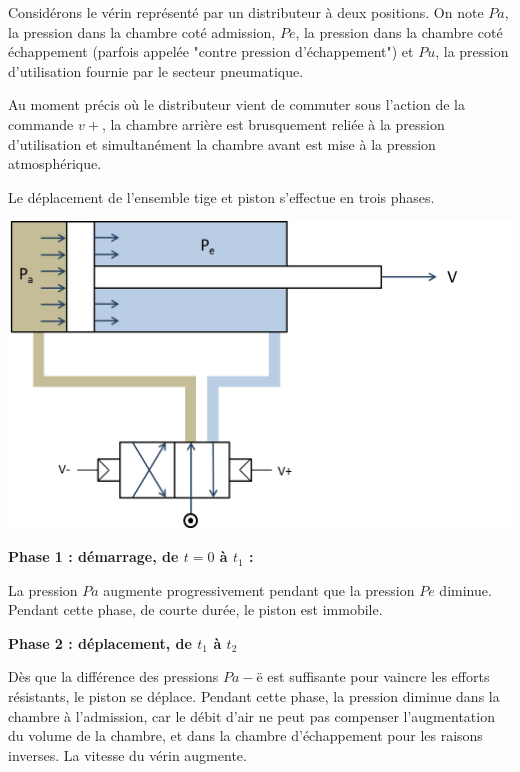 \documentclass[10pt]{article}
\begin{document}
\begin{minipage}[c]{.47\textwidth}
Considérons le vérin représenté par un distributeur à deux positions. On note $Pa$, la pression dans la chambre coté admission, $Pe$, la pression dans la chambre coté échappement (parfois appelée "contre pression d'échappement") et $Pu$, la pression d'utilisation fournie par le secteur pneumatique. 


Au moment précis où le distributeur vient de commuter sous l'action de la commande $v+$, la chambre arrière est brusquement reliée à la pression d'utilisation et simultanément la chambre avant est mise à la pression atmosphérique.

Le déplacement de l'ensemble tige et piston s'effectue en trois phases.

\end{minipage} \hfill
\begin{minipage}[c]{.5\textwidth}
\begin{center}
\includegraphics[width=.9\textwidth]{images/fig2}
\end{center}
\end{minipage}


\textbf{Phase 1 : démarrage, de $t=0$ à $t_1$ :} 

La pression $Pa$ augmente progressivement pendant que la pression $Pe$ diminue. Pendant cette phase, de courte durée, le piston est immobile.

\textbf{Phase 2 : déplacement, de $t_1$ à $t_2$} 

Dès que la différence des pressions $Pa-ë$ est suffisante pour vaincre les efforts résistants, le piston se déplace. Pendant cette phase, la pression diminue dans la chambre à l'admission, car le débit d'air ne peut pas compenser l'augmentation du volume de la chambre, et dans la chambre d'échappement pour les raisons inverses. La vitesse du vérin augmente. 
\end{document}
